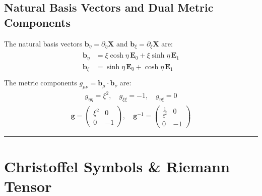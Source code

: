 \documentclass[letterpaper,10pt,english]{jupyterBook}
\begin{document}
\subsection{Natural Basis Vectors and Dual Metric Components}
\label{\detokenize{ch/relativity-special/rindler:natural-basis-vectors-and-dual-metric-components}}\label{\detokenize{ch/relativity-special/rindler:id1}}
\sphinxAtStartPar
The natural basis vectors \(\mathbf{b}_\eta = \partial_\eta \mathbf{X}\) and \(\mathbf{b}_{\xi} = \partial_{\xi} \mathbf{X}\) are:
\begin{equation*}
\begin{split}\begin{aligned}
  \mathbf{b}_\eta  & = \xi \cosh\eta \, \mathbf{E}_0 + \xi \sinh\eta \, \mathbf{E}_1 \\
  \mathbf{b}_{\xi} & = \sinh\eta \, \mathbf{E}_0 + \cosh\eta \, \mathbf{E}_1 \\
\end{aligned}\end{split}
\end{equation*}
\sphinxAtStartPar
The metric components \(g_{\mu\nu} = \mathbf{b}_\mu \cdot \mathbf{b}_\nu\) are:
\begin{equation*}
\begin{split}g_{\eta\eta} = \xi^2, \quad g_{\xi\xi} = -1, \quad g_{\eta\xi} = 0\end{split}
\end{equation*}\begin{equation*}
\begin{split}\mathbf{g} = \begin{pmatrix} \xi^2 & 0 \\ 0 & -1 \end{pmatrix}, \quad \mathbf{g}^{-1} = \begin{pmatrix} \frac{1}{\xi^2} & 0 \\ 0 & -1 \end{pmatrix}\end{split}
\end{equation*}

\bigskip\hrule\bigskip



\section{Christoffel Symbols \& Riemann Tensor}
\label{\detokenize{ch/relativity-special/rindler:christoffel-symbols-riemann-tensor}}
\end{document}
